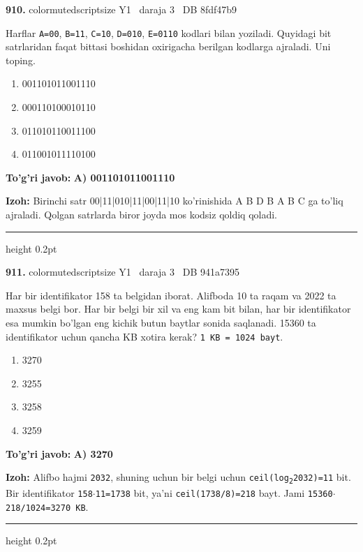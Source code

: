 \documentclass[10pt,a4paper,oneside]{article}
\begin{document}
\noindent\textbf{\color{ink}910.}  {color{muted}scriptsize Y1 \textbullet\ daraja 3 \textbullet\ DB 8fdf47b9}
\par
Harflar \texttt{A=00}, \texttt{B=11}, \texttt{C=10}, \texttt{D=010}, \texttt{E=0110} kodlari bilan yoziladi. Quyidagi bit satrlaridan faqat bittasi boshidan oxirigacha berilgan kodlarga ajraladi. Uni toping.
\begin{enumerate}[label=\Alph*),leftmargin=9mm]
\item 001101011001110
\item 000110100010110
\item 011010110011100
\item 011001011110100
\end{enumerate}
\begin{tcolorbox}[enhanced,breakable,colback=teal!4,colframe=teal!50!black,boxrule=0.5pt,arc=1.1mm,left=3mm,right=3mm,top=1.7mm,bottom=1.7mm,before skip=2mm,after skip=2mm]
\textbf{\color{teal}To'g'ri javob:} \textbf{A) 001101011001110}
\par\smallskip
\textbf{Izoh:} Birinchi satr 00|11|010|11|00|11|10 ko'rinishida A B D B A B C ga to'liq ajraladi. Qolgan satrlarda biror joyda mos kodsiz qoldiq qoladi.
\end{tcolorbox}
\vspace{2mm}\hrule height 0.2pt \vspace{3mm}

\noindent\textbf{\color{ink}911.}  {color{muted}scriptsize Y1 \textbullet\ daraja 3 \textbullet\ DB 941a7395}
\par
Har bir identifikator 158 ta belgidan iborat. Alifboda 10 ta raqam va 2022 ta maxsus belgi bor. Har bir belgi bir xil va eng kam bit bilan, har bir identifikator esa mumkin bo'lgan eng kichik butun baytlar sonida saqlanadi. 15360 ta identifikator uchun qancha KB xotira kerak? \texttt{1 KB = 1024 bayt}.
\begin{enumerate}[label=\Alph*),leftmargin=9mm]
\item 3270
\item 3255
\item 3258
\item 3259
\end{enumerate}
\begin{tcolorbox}[enhanced,breakable,colback=teal!4,colframe=teal!50!black,boxrule=0.5pt,arc=1.1mm,left=3mm,right=3mm,top=1.7mm,bottom=1.7mm,before skip=2mm,after skip=2mm]
\textbf{\color{teal}To'g'ri javob:} \textbf{A) 3270}
\par\smallskip
\textbf{Izoh:} Alifbo hajmi \texttt{2032}, shuning uchun bir belgi uchun \texttt{ceil(log\textsubscript{2}2032)=11} bit. Bir identifikator \texttt{158\ensuremath{\cdot}11=1738} bit, ya'ni \texttt{ceil(1738/8)=218} bayt. Jami \texttt{15360\ensuremath{\cdot}218/1024=3270 KB}.
\end{tcolorbox}
\vspace{2mm}\hrule height 0.2pt \vspace{3mm}
\end{document}
